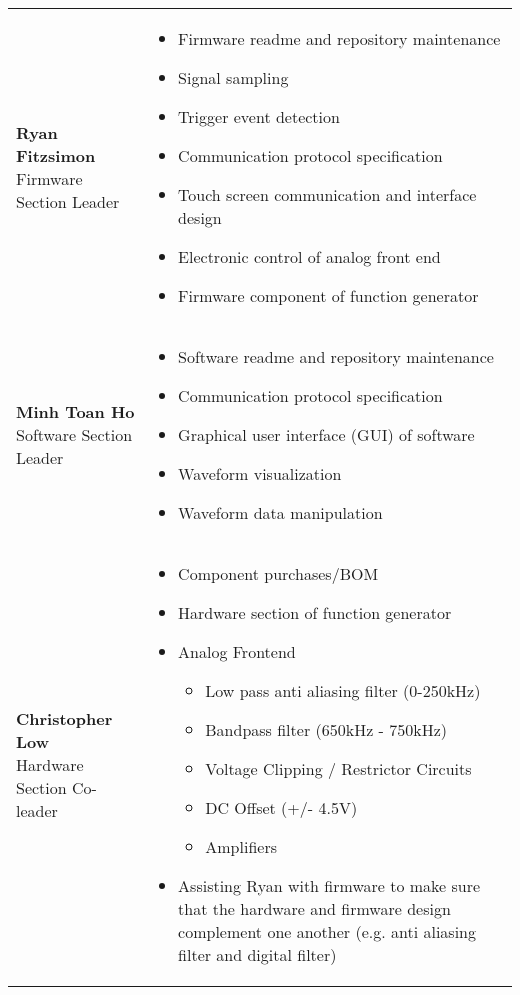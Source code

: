 \documentclass[12pt]{report}
\begin{document}
\vspace{.8cm}
\begin{tabular}{l p{}}
	
	\pbox{20cm}{\textbf{Ryan Fitzsimon} \\ Firmware Section Leader} &
	{\begin{itemize}
		\item Firmware readme and repository maintenance
		\item Signal sampling
		\item Trigger event detection
		\item Communication protocol specification
		\item Touch screen communication and interface design
		\item Electronic control of analog front end
		\item Firmware component of function generator
	\end{itemize}}\\
	
	\pbox{20cm}{\textbf{Minh Toan Ho} \\ Software Section Leader} &
	{\begin{itemize}
		\item Software readme and repository maintenance
		\item Communication protocol specification
		\item Graphical user interface (GUI) of software
		\item Waveform visualization
		\item Waveform data manipulation
	\end{itemize}}\\
	
	\pbox{20cm}{\textbf{Christopher Low} \\ Hardware Section Co-leader} &
	{\begin{itemize}
		\item Component purchases/BOM
		\item Hardware section of function generator
		\item Analog Frontend
		\begin{itemize}
			\item Low pass anti aliasing filter (0-250kHz)
			\item Bandpass filter (650kHz - 750kHz)
			\item Voltage Clipping / Restrictor Circuits
			\item DC Offset (+/- 4.5V)
			\item Amplifiers
		\end{itemize}
		\item Assisting Ryan with firmware to make sure that the hardware and firmware design complement one another (e.g. anti aliasing filter and digital filter)
	\end{itemize}}\\


\end{tabular}
\end{document}
